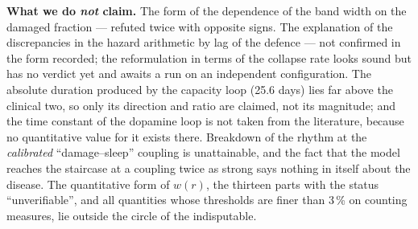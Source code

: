 \textbf{What we do \emph{not} claim.} The form of the dependence of the band width on the damaged fraction --- refuted twice with opposite signs. The explanation of the discrepancies in the hazard arithmetic by lag of the defence --- not confirmed in the form recorded; the reformulation in terms of the collapse rate looks sound but has no verdict yet and awaits a run on an independent configuration. The absolute duration produced by the capacity loop (25.6 days) lies far above the clinical two, so only its direction and ratio are claimed, not its magnitude; and the time constant of the dopamine loop is not taken from the literature, because no quantitative value for it exists there. Breakdown of the rhythm at the \emph{calibrated} ``damage--sleep'' coupling is unattainable, and the fact that the model reaches the staircase at a coupling twice as strong says nothing in itself about the disease. The quantitative form of $w(r)$, the thirteen parts with the status ``unverifiable'', and all quantities whose thresholds are finer than 3\,\% on counting measures, lie outside the circle of the indisputable.

